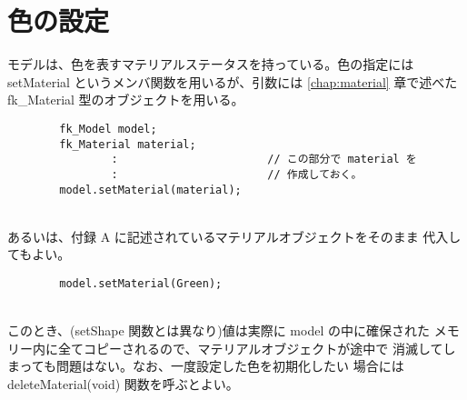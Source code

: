 \section{色の設定}
モデルは、色を表すマテリアルステータスを持っている。色の指定には
setMaterial というメンバ関数を用いるが、引数には \ref{chap:material} 章で述べた
fk\_Material 型のオブジェクトを用いる。
\\
\begin{screen}
\begin{verbatim}
        fk_Model model;
        fk_Material material;
                :                       // この部分で material を
                :                       // 作成しておく。
        model.setMaterial(material);
\end{verbatim}
\end{screen}
~ \\
あるいは、付録 A に記述されているマテリアルオブジェクトをそのまま
代入してもよい。
\\
\begin{screen}
\begin{verbatim}
        model.setMaterial(Green);
\end{verbatim}
\end{screen}
~ \\
このとき、(setShape 関数とは異なり)値は実際に model の中に確保された
メモリー内に全てコピーされるので、マテリアルオブジェクトが途中で
消滅してしまっても問題はない。なお、一度設定した色を初期化したい
場合には deleteMaterial(void) 関数を呼ぶとよい。

